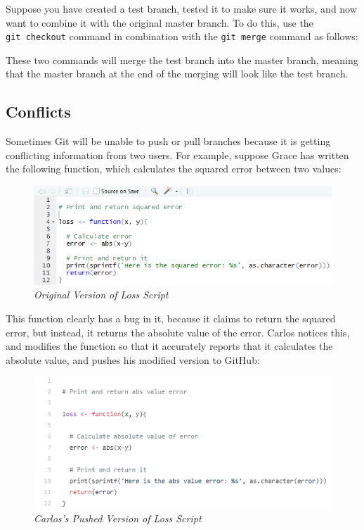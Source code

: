 \documentclass[
]{book}
\newenvironment{Shaded}{\begin{snugshade}}{\end{snugshade}}
\newcommand{\NormalTok}[1]{#1}
\newcommand{\SpecialCharTok}[1]{\textcolor[rgb]{0.00,0.00,0.00}{#1}}
\begin{document}
Suppose you have created a test branch, tested it to make sure it works, and now want to combine it with the original master branch. To do this, use the \texttt{git\ checkout} command in combination with the \texttt{git\ merge} command as follows:

\begin{Shaded}
\end{Shaded}

These two commands will merge the test branch into the master branch, meaning that the master branch at the end of the merging will look like the test branch.

\hypertarget{conflicts}{%
\subsection{Conflicts}\label{conflicts}}

Sometimes Git will be unable to push or pull branches because it is getting conflicting information from two users. For example, suppose Grace has written the following function, which calculates the squared error between two values:

\begin{figure}
\centering
\includegraphics{images/loss0.PNG}
\caption{\emph{Original Version of Loss Script}}
\end{figure}

This function clearly has a bug in it, because it claims to return the squared error, but instead, it returns the absolute value of the error. Carlos notices this, and modifies the function so that it accurately reports that it calculates the absolute value, and pushes his modified version to GitHub:

\begin{figure}
\centering
\includegraphics{images/lossCarlos.PNG}
\caption{\emph{Carlos's Pushed Version of Loss Script}}
\end{figure}
\end{document}
